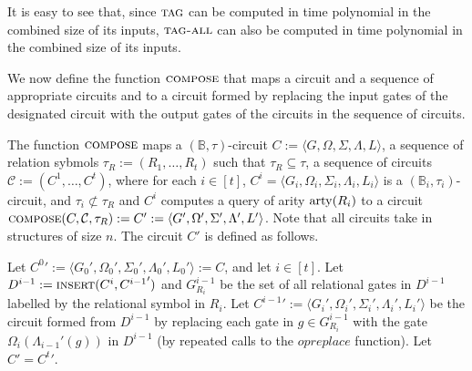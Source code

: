 \documentclass[../paper.tex]{subfiles}
\begin{document}
It is easy to see that, since ${\normalfont\textsc{tag}}$ can be computed in time polynomial in
the combined size of its inputs, ${\normalfont\textsc{tag-all}}$ can also be computed in time
polynomial in the combined size of its inputs.

We now define the function ${\normalfont\textsc{compose}}$ that maps a circuit and a sequence of
appropriate circuits and to a circuit formed by replacing the input gates of the
designated circuit with the output gates of the circuits in the sequence of
circuits.

\begin{definition}
  The function ${\normalfont\textsc{compose}}$ maps a $(\mathbb{B}, \tau)$-circuit $C := \langle
  G, \Omega, \Sigma, \Lambda, L \rangle$, a sequence of relation sybmols $\tau_R
  := (R_1, \ldots, R_t)$ such that $\tau_R \subseteq \tau$, a sequence of
  circuits $\mathcal{C} := ( C^1, \ldots, C^t)$, where for each $i \in [t]$,
  $C^i = \langle G_i, \Omega_i, \Sigma_i, \Lambda_i, L_i \rangle$ is a
  $(\mathbb{B}_i, \tau_i)$-circuit, and $\tau_i \not\subset \tau_R$ and $C^i$
  computes a query of arity $\mathrm{arty}(R_i)$ to a circuit ${\normalfont\textsc{compose}}(C,
  \mathcal{C}, \tau_R) := C' := \langle G', \Omega', \Sigma', \Lambda', L'
  \rangle$. Note that all circuits take in structures of size $n$. The circuit
  $C'$ is defined as follows.
  
  Let ${C^0}' := \langle G_0', \Omega_0', \Sigma_0', \Lambda_0', L_0' \rangle :=
  C$, and let $i \in [t]$. Let $D^{i-1}:= {\normalfont\textsc{insert}} (C^i, {C^{i-1}}')$ and
  $G^{i-1}_{R_i}$ be the set of all relational gates in $D^{i-1}$ labelled by
  the relational symbol in $R_i$. Let ${C^{i-1}}' := \langle G_i', \Omega_i',
  \Sigma_i', \Lambda_i', L_i' \rangle$ be the circuit formed from $D^{i-1}$ by
  replacing each gate in $g \in G^{i-1}_{R_i}$ with the gate
  $\Omega_{i}(\Lambda_{i-1}'(g))$ in $D^{i-1}$ (by repeated calls to the
  $op{replace}$ function). Let $C' = {C^{t}}'$.
\end{definition}

  
\end{document}
